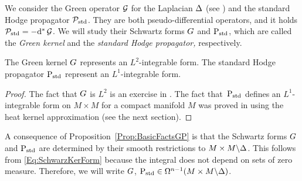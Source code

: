 \documentclass[\MainFolder/Text.tex]{subfiles}
\begin{document}

We consider the Green operator $\operatorname{\mathcal{G}}$ for the Laplacian $\operatorname{\Delta}$ (see \cite{Warner1983}) and the standard Hodge propagator $\mathcal{P}_{\mathrm{std}}$. They are both pseudo-differential operators, and it holds $\mathcal{P}_{\mathrm{std}} = - \mathrm{d}^* \operatorname{\mathcal{G}}$. We will study their Schwartz forms $G$ and $\mathrm{P}_{\mathrm{std}}$, which are called the \emph{Green kernel} and the \emph{standard Hodge propagator,} respectively.

\begin{Proposition}\label{Prop:BasicFactsGP}
The Green kernel $G$ represents an $L^2$-integrable form.
The standard Hodge propagator $\mathrm{P}_{\mathrm{std}}$ represent an $L^1$-integrable form.
\end{Proposition}
\begin{proof}
The fact that $G$ is $L^2$ is an exercise in \cite{Warner1983}. The fact that~$\mathrm{P}_{\mathrm{std}}$ defines an $L^1$-integrable form on $M\times M$ for a compact manifold $M$ was proved in \cite{Harris2004} using the heat kernel approximation (see the next section).
\end{proof}

A consequence of Proposition~\ref{Prop:BasicFactsGP} is that the Schwartz forms $G$ and $\mathrm{P}_{\mathrm{std}}$ are determined by their smooth restrictions to $M\times M\backslash \Delta$. This follows from \eqref{Eq:SchwarzKerForm} because the integral does not depend on sets of zero measure. Therefore, we will write $G$, $\mathrm{P}_{\mathrm{std}} \in \Omega^{n-1}(M\times M\backslash\Delta)$.
\end{document}
